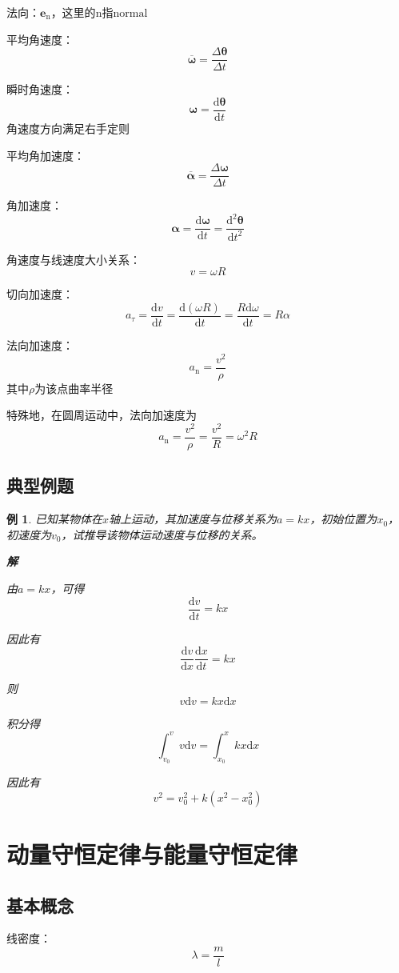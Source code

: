 \documentclass[12pt, a4paper, twoside]{ctexbook}
\newtheorem{example}[theorem]{例}
\begin{document}
{\sonti 法向}：$\boldsymbol{e}_\mathrm{n}$，这里的$\mathrm{n}$指$\mathrm{normal}$

{\sonti 平均角速度}：
$$
\overline{\boldsymbol{\omega}}=\frac{\Delta \boldsymbol{\theta}}{\Delta t}
$$

{\sonti 瞬时角速度}：
$$
\boldsymbol{\omega}=\frac{\mathrm{d}\boldsymbol{\theta}}{\mathrm{d}t}
$$
角速度方向满足右手定则

{\sonti 平均角加速度}：
$$
\overline{\boldsymbol{\alpha}}=\frac{\Delta\boldsymbol{\omega}}{\Delta t}
$$

{\sonti 角加速度}：
$$
\boldsymbol{\alpha}=\frac{\mathrm{d}\boldsymbol{\omega}}{\mathrm{d}t}= \frac{\mathrm{d}^2\boldsymbol{\theta}}{\mathrm{d}t^2}
$$

{\sonti 角速度与线速度大小关系}：
$$
v=\omega R
$$

{\sonti 切向加速度}：
$$
a_\tau=\frac{\mathrm{d}v}{\mathrm{d}t}=\frac{\mathrm{d}\left(\omega R\right)}{\mathrm{d}t}=\frac{R\mathrm{d}\omega}{\mathrm{d}t}=R\alpha
$$

{\sonti 法向加速度}：
$$
a_\mathrm{n}=\frac{v^2}{\rho}
$$
其中$\rho$为该点曲率半径

特殊地，在圆周运动中，法向加速度为
$$
a_\mathrm{n}=\frac{v^2}{\rho}=\frac{v^2}{R}=\omega^2R
$$

\section{典型例题}
\begin{example}
    已知某物体在$x$轴上运动，其加速度与位移关系为$a=kx$，初始位置为$x_0$，初速度为$v_0$，试推导该物体运动速度与位移的关系。

    \noindent\textbf{解}

    由$a=kx$，可得
    $$
    \frac{\mathrm{d}v}{\mathrm{d}t}=kx
    $$
    
    因此有
    $$
    \frac{\mathrm{d}v}{\mathrm{d}x}\frac{\mathrm{d}x}{\mathrm{d}t}=kx
    $$
    
    则
    $$
    v\mathrm{d}v=kx\mathrm{d}x
    $$
    
    积分得
    $$
    \int_{v_0}^{v}v\mathrm{d}v=\int_{x_0}^{x}kx\mathrm{d}x
    $$
    
    因此有
    $$
    v^2=v_0^2+k\left(x^2-x_0^2\right)
    $$
\end{example}
\chapter{动量守恒定律与能量守恒定律}
\newpage
\section{基本概念}
{\sonti 线密度}：
$$
\lambda=\frac{m}{l}
$$
\end{document}

